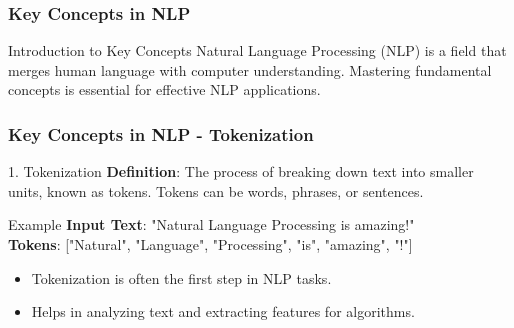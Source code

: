 \documentclass[aspectratio=169]{beamer}
\begin{document}
\begin{frame}[fragile]
    \frametitle{Key Concepts in NLP}
    \begin{block}{Introduction to Key Concepts}
        Natural Language Processing (NLP) is a field that merges human language with computer understanding. 
        Mastering fundamental concepts is essential for effective NLP applications.
    \end{block}
\end{frame}

\begin{frame}[fragile]
    \frametitle{Key Concepts in NLP - Tokenization}
    \begin{block}{1. Tokenization}
        \textbf{Definition}: The process of breaking down text into smaller units, known as tokens. 
        Tokens can be words, phrases, or sentences.
    \end{block}

    \begin{exampleblock}{Example}
        \textbf{Input Text}: "Natural Language Processing is amazing!" \\
        \textbf{Tokens}: ["Natural", "Language", "Processing", "is", "amazing", "!"]
    \end{exampleblock}

    \begin{itemize}
        \item Tokenization is often the first step in NLP tasks.
        \item Helps in analyzing text and extracting features for algorithms.
    \end{itemize}
\end{frame}
\end{document}
